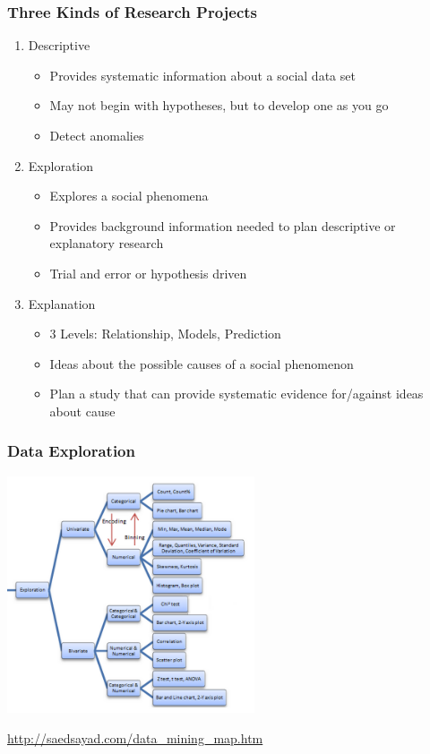 \documentclass{beamer}
\begin{document}
\begin{frame}\frametitle{Three Kinds of Research Projects}
\begin{center}
{\Large 
\begin{enumerate}
\item Descriptive
	\begin{itemize}
	\item Provides systematic information about a social data set
	\item May not begin with hypotheses, but to develop one as you go
	\item Detect anomalies
	\end{itemize}
\item Exploration
	\begin{itemize}
	\item Explores a social phenomena
	\item Provides background information needed to plan descriptive or explanatory research
	\item Trial and error or hypothesis driven
	\end{itemize}
\item Explanation
	\begin{itemize}
	\item 3 Levels: Relationship, Models, Prediction
	\item Ideas about the possible causes of a social phenomenon
	\item Plan a study that can provide systematic evidence for/against ideas about cause
	\end{itemize}
\end{enumerate}
}
\end{center}
\end{frame}

\begin{frame}\frametitle{Data Exploration}
  \begin{center}
    \includegraphics[height=7cm]{./imgs/exploration.png} \\
  \end{center}
      \textcolor{white}{\tiny \url{http://saedsayad.com/data_mining_map.htm}}
\end{frame}
\end{document}
